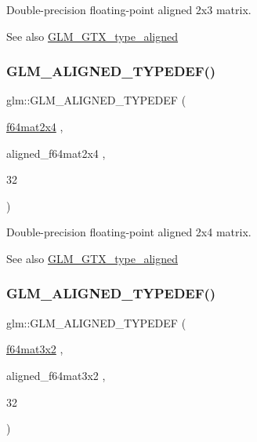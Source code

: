 Double-\/precision floating-\/point aligned 2x3 matrix. \begin{DoxySeeAlso}{See also}
\mbox{\hyperlink{group__gtx__type__aligned}{G\+L\+M\+\_\+\+G\+T\+X\+\_\+type\+\_\+aligned}} 
\end{DoxySeeAlso}
\mbox{\label{group__gtx__type__aligned_gabbc811d1c52ed2b8cfcaff1378f75c69}} 
\subsubsection{\texorpdfstring{GLM\_ALIGNED\_TYPEDEF()}{GLM\_ALIGNED\_TYPEDEF()}\hspace{0.1cm}{\footnotesize\ttfamily [198/209]}}
{\footnotesize\ttfamily glm\+::\+G\+L\+M\+\_\+\+A\+L\+I\+G\+N\+E\+D\+\_\+\+T\+Y\+P\+E\+D\+EF (\begin{DoxyParamCaption}\item[{\mbox{\hyperlink{group__gtc__type__precision_gaf18b9f693f2ef743d93c9afd5cfbe229}{f64mat2x4}}}]{,  }\item[{aligned\+\_\+f64mat2x4}]{,  }\item[{32}]{ }\end{DoxyParamCaption})}

Double-\/precision floating-\/point aligned 2x4 matrix. \begin{DoxySeeAlso}{See also}
\mbox{\hyperlink{group__gtx__type__aligned}{G\+L\+M\+\_\+\+G\+T\+X\+\_\+type\+\_\+aligned}} 
\end{DoxySeeAlso}
\mbox{\label{group__gtx__type__aligned_ga9ddf5212777734d2fd841a84439f3bdf}} 
\subsubsection{\texorpdfstring{GLM\_ALIGNED\_TYPEDEF()}{GLM\_ALIGNED\_TYPEDEF()}\hspace{0.1cm}{\footnotesize\ttfamily [199/209]}}
{\footnotesize\ttfamily glm\+::\+G\+L\+M\+\_\+\+A\+L\+I\+G\+N\+E\+D\+\_\+\+T\+Y\+P\+E\+D\+EF (\begin{DoxyParamCaption}\item[{\mbox{\hyperlink{group__gtc__type__precision_ga0039ae03558b5242466f4c344c3c7d65}{f64mat3x2}}}]{,  }\item[{aligned\+\_\+f64mat3x2}]{,  }\item[{32}]{ }\end{DoxyParamCaption})}

